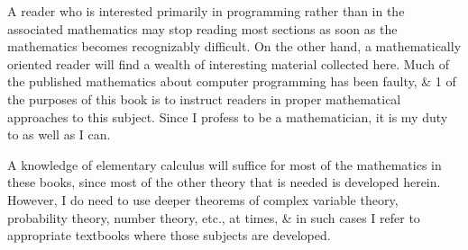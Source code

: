 \documentclass{article}
\begin{document}
A reader who is interested primarily in programming rather than in the associated mathematics may stop reading most sections as soon as the mathematics becomes recognizably difficult. On the other hand, a mathematically oriented reader will find a wealth of interesting material collected here. Much of the published mathematics about computer programming has been faulty, \& 1 of the purposes of this book is to instruct readers in proper mathematical approaches to this subject. Since I profess to be a mathematician, it is my duty to  as well as I can.

A knowledge of elementary calculus will suffice for most of the mathematics in these books, since most of the other theory that is needed is developed herein. However, I do need to use deeper theorems of complex variable theory, probability theory, number theory, etc., at times, \& in such cases I refer to appropriate textbooks where those subjects are developed.
\end{document}
